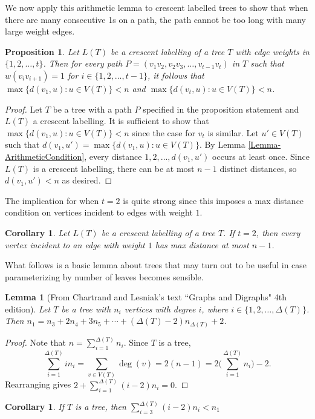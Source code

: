 \documentclass[12]{article}
\newtheorem{lem}{Lemma} %
\newtheorem{prop}[thm]{Proposition}
\newtheorem{cor}[thm]{Corollary}
\theoremstyle{definition}
\begin{document}
	We now apply this arithmetic lemma to crescent labelled trees to show that when there are many consecutive 1s on a path, the path cannot be too long with many large weight edges.
	
	\begin{prop}
		Let $L(T)$ be a crescent labelling of a tree $T$ with edge weights in $\{1,2,\ldots,t\}$.  Then for every path $P = (v_1v_2,v_2v_3,\ldots,v_{t-1}v_t)$ in $T$ such that $w(v_iv_{i+1}) = 1$ for $i \in \{1,2,\ldots,t-1\}$, it follows that $\max\{d(v_1,u): u \in V(T)\} < n$ and $\max\{d(v_t,u): u \in V(T)\} < n$.
	\end{prop}
	
	\begin{proof}
		Let $T$ be a tree with a path $P$ specified in the proposition statement and $L(T)$ a crescent labelling.  It is sufficient to show that $\max\{d(v_1,u): u \in V(T)\} < n$ since the case for $v_t$ is similar.  Let $u' \in V(T)$ such that $d(v_1,u') = \max\{d(v_1,u): u \in V(T)\}$.  By Lemma \ref{Lemma-ArithmeticCondition}, every distance $1,2,\ldots, d(v_1,u')$ occurs at least once.  Since $L(T)$ is a crescent labelling, there can be at most $n-1$ distinct distances, so $d(v_1,u') < n$ as desired. \qedhere
	\end{proof}
	The implication for when $t=2$ is quite strong since this imposes a max distance condition on vertices incident to edges with weight $1$.
	\begin{cor}
		Let $L(T)$ be a crescent labelling of a tree $T$.  If $t = 2$, then every vertex incident to an edge with weight $1$ has max distance at most $n-1$.
	\end{cor}
	
	
	What follows is a basic lemma about trees that may turn out to be useful in case parameterizing by number of leaves becomes sensible.
	
	\begin{lem}[From Chartrand and Lesniak's text ``Graphs and Digraphs" 4th edition]
		Let $T$ be a tree with $n_i$ vertices with degree $i$, where $i \in \{1,2,\ldots,\Delta(T)\}$.  Then $n_1 = n_3 + 2n_4 + 3n_5 + \cdots + (\Delta(T)-2)n_{\Delta(T)} + 2$.
	\end{lem}
	
	\begin{proof}
		Note that $n = \sum_{i=1}^{\Delta(T)}n_i$.  Since $T$ is a tree, 
		$$\sum_{i=1}^{\Delta(T)} in_i  = \sum_{v \in V(T)} \deg(v) = 2(n-1) = 2\biggr(\sum_{i=1}^{\Delta(T)}n_i \biggr) - 2.$$  
		Rearranging gives $2+ \sum_{i=1}^{\Delta(T)} (i-2)n_i = 0.$
	\end{proof}
	
	\begin{cor}
		If $T$ is a tree, then $\sum_{i=3}^{\Delta(T)}(i-2)n_i < n_1$
	\end{cor}
	
\end{document}
